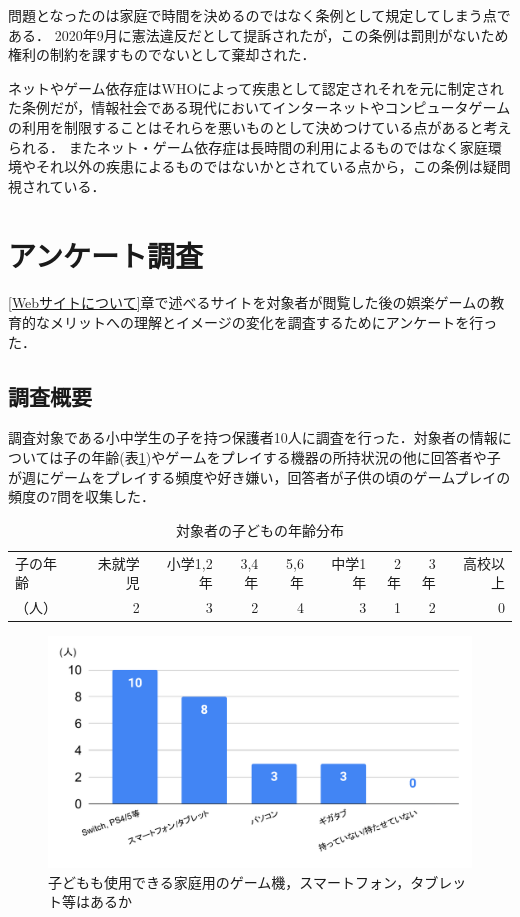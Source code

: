 \documentclass[12pt,a4j,titlepage]{ltjsarticle}
\begin{document}
問題となったのは家庭で時間を決めるのではなく条例として規定してしまう点である．
2020年9月に憲法違反だとして提訴されたが，この条例は罰則がないため権利の制約を課すものでないとして棄却された．

ネットやゲーム依存症はWHOによって疾患として認定されそれを元に制定された条例だが，情報社会である現代においてインターネットやコンピュータゲームの利用を制限することはそれらを悪いものとして決めつけている点があると考えられる．
またネット・ゲーム依存症は長時間の利用によるものではなく家庭環境やそれ以外の疾患によるものではないかとされている点から，この条例は疑問視されている．

\clearpage
\section{アンケート調査}\label{アンケート調査}
\ref{Webサイトについて}章で述べるサイトを対象者が閲覧した後の娯楽ゲームの教育的なメリットへの理解とイメージの変化を調査するためにアンケートを行った．

\subsection{調査概要}
調査対象である小中学生の子を持つ保護者10人に調査を行った．対象者の情報については子の年齢(表\ref{table:情報})やゲームをプレイする機器の所持状況の他に回答者や子が週にゲームをプレイする頻度や好き嫌い，回答者が子供の頃のゲームプレイの頻度の7問を収集した．

\begin{table}[H]
 \caption{対象者の子どもの年齢分布}
 \label{table:情報}
 \small
 \centering
  \begin{tabular}{lrrrrrrrr}
  \hline
   子の年齢 & 未就学児 & 小学1,2年 & 3,4年 & 5,6年 & 中学1年 & 2年 & 3年 & 高校以上\\
   （人）& 2 & 3 & 2 & 4 & 3 & 1 & 2 & 0\\
   \hline
  \end{tabular}
\end{table}

\begin{figure}[H]
 \begin{center}
  \includegraphics[keepaspectratio, scale=0.4]{chart1.pdf}
 \end{center}
 \caption{子どもも使用できる家庭用のゲーム機，スマートフォン，タブレット等はあるか}
 \label{fig:ゲーム所持}
\end{figure}
\end{document}

